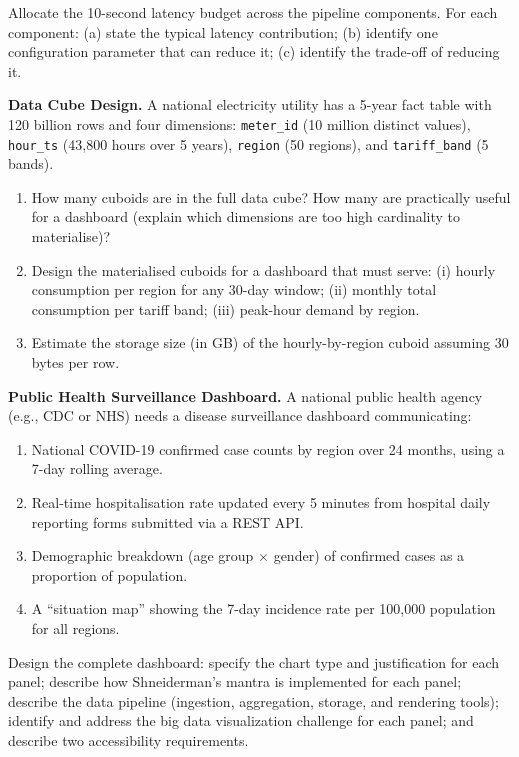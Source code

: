 Allocate the 10-second latency budget across the pipeline components.
For each component: (a) state the typical latency contribution; (b) identify
one configuration parameter that can reduce it; (c) identify the trade-off
of reducing it.

\ap \textbf{Data Cube Design.}
A national electricity utility has a 5-year fact table with 120 billion
rows and four dimensions: \texttt{meter\_id} (10 million distinct values),
\texttt{hour\_ts} (43{,}800 hours over 5 years), \texttt{region}
(50 regions), and \texttt{tariff\_band} (5 bands).
\begin{enumerate}[label=(\alph*)]
  \item How many cuboids are in the full data cube? How many are practically
        useful for a dashboard (explain which dimensions are too high
        cardinality to materialise)?
  \item Design the materialised cuboids for a dashboard that must serve:
        (i) hourly consumption per region for any 30-day window;
        (ii) monthly total consumption per tariff band; (iii) peak-hour
        demand by region.
  \item Estimate the storage size (in GB) of the hourly-by-region
        cuboid assuming 30 bytes per row.
\end{enumerate}


\dpr \textbf{Public Health Surveillance Dashboard.}
A national public health agency (e.g., CDC or NHS) needs a disease
surveillance dashboard communicating:
\begin{enumerate}[label=(\alph*)]
  \item National COVID-19 confirmed case counts by region over 24 months,
        using a 7-day rolling average.
  \item Real-time hospitalisation rate updated every 5 minutes from hospital
        daily reporting forms submitted via a REST API.
  \item Demographic breakdown (age group $\times$ gender) of confirmed cases
        as a proportion of population.
  \item A ``situation map'' showing the 7-day incidence rate per 100{,}000
        population for all regions.
\end{enumerate}
Design the complete dashboard: specify the chart type and justification
for each panel; describe how Shneiderman's mantra is implemented for each
panel; describe the data pipeline (ingestion, aggregation, storage, and
rendering tools); identify and address the big data visualization challenge
for each panel; and describe two accessibility requirements.

